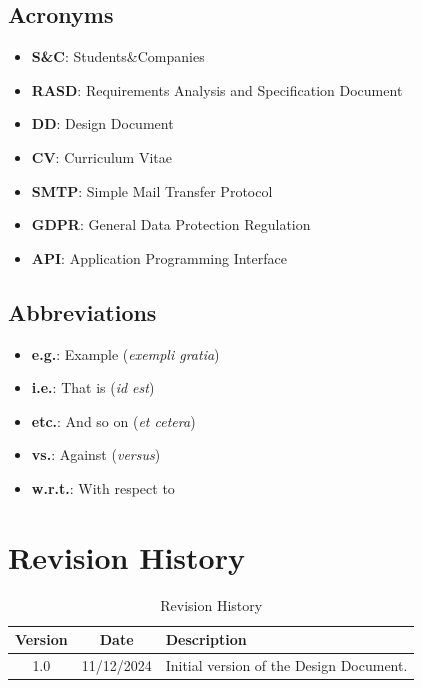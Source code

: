 \subsection{Acronyms}\label{subsec:acronyms}
\begin{itemize}
    \item \textbf{S\&C}: Students\&Companies
    \item \textbf{RASD}: Requirements Analysis and Specification Document
    \item \textbf{DD}: Design Document
    \item \textbf{CV}: Curriculum Vitae
    \item \textbf{SMTP}: Simple Mail Transfer Protocol
    \item \textbf{GDPR}: General Data Protection Regulation
    \item \textbf{API}: Application Programming Interface
\end{itemize}

\subsection{Abbreviations}\label{subsec:abbreviations}
\begin{itemize}
    \item \textbf{e.g.}: Example (\textit{exempli gratia})
    \item \textbf{i.e.}: That is (\textit{id est})
    \item \textbf{etc.}: And so on (\textit{et cetera})
    \item \textbf{vs.}: Against (\textit{versus})
    \item \textbf{w.r.t.}: With respect to
\end{itemize}

\section{Revision History}\label{sec:revision-history}
\begin{table}[H]
    \centering
    \renewcommand{\arraystretch}{1.5}
    \begin{tabular}{|c|c|p{}|}
        \hline
        \rowcolor[HTML]{5C8A99}
        \textbf{Version} & \textbf{Date} & \textbf{Description} \\ \hline
        1.0              & 11/12/2024    & Initial version of the Design Document. \\ \hline
    \end{tabular}
    \caption{Revision History}
\end{table}

